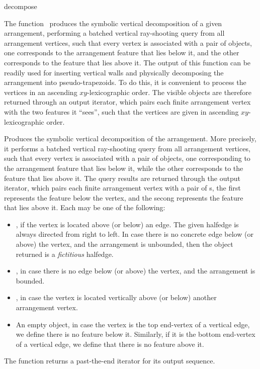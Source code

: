 \ccRefPageBegin

\begin{ccRefFunction}{decompose}

\ccDefinition

The function \ccRefName\ produces the symbolic vertical decomposition of a
given arrangement, performing a batched vertical ray-shooting query from
all arrangement vertices, such that every vertex is associated with a pair
of objects, one corresponds to the arrangement feature that lies below it,
and the other corresponds to the feature that lies above it.
The output of this function can be readily used for inserting vertical walls
and physically decomposing the arrangement into pseudo-trapezoids. To do
this, it is convenient to process the vertices in an ascending
$xy$-lexicographic order. The visible objects are therefore returned through
an output iterator, which pairs each finite arrangement vertex with the two
features it ``sees'', such that the vertices are given in ascending
$xy$-lexicographic order. 



Produces the symbolic vertical decomposition of the  arrangement.
More precisely, it performs a batched vertical ray-shooting query from all
arrangement vertices, such that every vertex is associated with a pair of
objects, one corresponding to the arrangement feature that lies below it,
while the other corresponds to the feature that lies above it. 
The query results are returned through the output iterator, which pairs
each finite arrangement vertex with a pair of s, the first
represents the feature below the vertex, and the secong represents the
feature that lies above it. Each  may be one of the following:
\begin{itemize}
\item {}, if the vertex is located above (or
  below) an edge. The given halfedge is always directed from right to left.
  In case there is no concrete edge below (or above) the vertex, and
  the arrangement is unbounded, then the object returned is a
  \emph{fictitious} halfedge.
\item {}, in case there is no edge below (or above)
  the vertex, and the arrangement is bounded.
\item {}, in case the vertex is located vertically
  above (or below) another arrangement vertex.
\item An empty object, in case the vertex is the top end-vertex of
  a vertical edge, we define there is no feature below it. Similarly, if
  it is the bottom end-vertex of a vertical edge, we define that there
  is no feature above it.
\end{itemize}
The function returns a past-the-end iterator for its output sequence.


\end{ccRefFunction}
